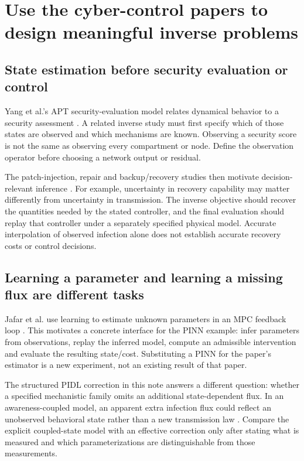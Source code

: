 \documentclass[11pt,a4paper]{article}
\theoremstyle{definition}
\theoremstyle{remark}
\begin{document}
\section{Use the cyber-control papers to design meaningful inverse problems}
\subsection{State estimation before security evaluation or control}
Yang et al.'s APT security-evaluation model relates dynamical behavior to a security assessment \cite{security2017}. A related inverse study must first specify which of those states are observed and which mechanisms are known. Observing a security score is not the same as observing every compartment or node. Define the observation operator before choosing a network output or residual.

The patch-injection, repair and backup/recovery studies then motivate decision-relevant inference \cite{patch2018,repair2019,backup2021}. For example, uncertainty in recovery capability may matter differently from uncertainty in transmission. The inverse objective should recover the quantities needed by the stated controller, and the final evaluation should replay that controller under a separately specified physical model. Accurate interpolation of observed infection alone does not establish accurate recovery costs or control decisions.

\subsection{Learning a parameter and learning a missing flux are different tasks}
Jafar et al. use learning to estimate unknown parameters in an MPC feedback loop \cite{feedback2024}. This motivates a concrete interface for the PINN example: infer parameters from observations, replay the inferred model, compute an admissible intervention and evaluate the resulting state/cost. Substituting a PINN for the paper's estimator is a new experiment, not an existing result of that paper.

The structured PIDL correction in this note answers a different question: whether a specified mechanistic family omits an additional state-dependent flux. In an awareness-coupled model, an apparent extra infection flux could reflect an unobserved behavioral state rather than a new transmission law \cite{awareness2025,malware2025}. Compare the explicit coupled-state model with an effective correction only after stating what is measured and which parameterizations are distinguishable from those measurements.
\end{document}
